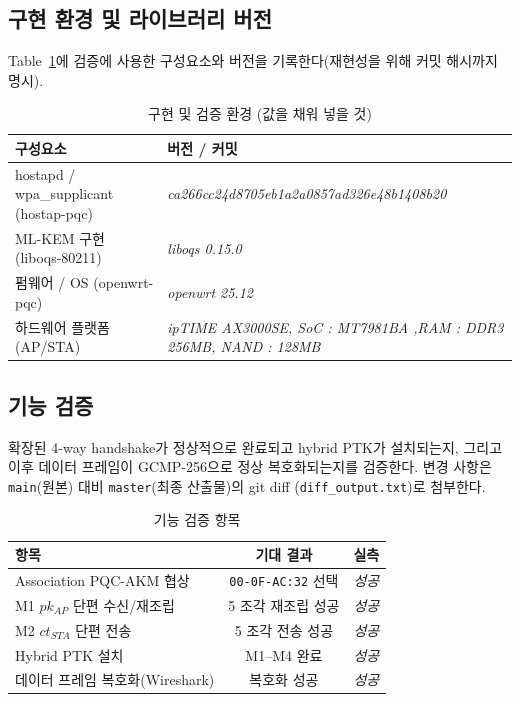 \documentclass[11pt]{article}
\newcommand{\pkAP}{\ensuremath{pk_{AP}}}
\newcommand{\ctSTA}{\ensuremath{ct_{STA}}}
\newcommand{\code}[1]{\texttt{#1}}
\theoremstyle{definition}
\theoremstyle{plain}
\begin{document}
\subsection{구현 환경 및 라이브러리 버전}
Table~\ref{tab:env}에 검증에 사용한 구성요소와 버전을 기록한다(재현성을 위해
커밋 해시까지 명시).

\begin{table}[H]\centering
\caption{구현 및 검증 환경 (값을 채워 넣을 것)}\label{tab:env}
\small
\begin{tabularx}{\linewidth}{@{}lX@{}}
\toprule
구성요소 & 버전 / 커밋 \\ \midrule
hostapd / wpa\_supplicant (hostap-pqc) & \textit{ca266cc24d8705eb1a2a0857ad326e48b1408b20} \\
ML-KEM 구현 (liboqs-80211) & \textit{liboqs 0.15.0} \\
펌웨어 / OS (openwrt-pqc) & \textit{openwrt 25.12} \\
하드웨어 플랫폼 (AP/STA) & \textit{ipTIME AX3000SE, SoC : MT7981BA ,RAM : DDR3 256MB, NAND : 128MB} \\
\bottomrule
\end{tabularx}
\end{table}

\subsection{기능 검증}
확장된 4-way handshake가 정상적으로 완료되고 hybrid PTK가 설치되는지,
그리고 이후 데이터 프레임이 GCMP-256으로 정상 복호화되는지를 검증한다. 변경
사항은 \code{main}(원본) 대비 \code{master}(최종 산출물)의 git diff
(\code{diff\_output.txt})로 첨부한다.

\begin{table}[H]\centering
\caption{기능 검증 항목}\label{tab:func}
\small
\begin{tabularx}{\linewidth}{@{}Xcc@{}}
\toprule
항목 & 기대 결과 & 실측 \\ \midrule
Association PQC-AKM 협상 & \code{00-0F-AC:32} 선택 & \textit{성공} \\
M1 \pkAP{} 단편 수신/재조립 & 5 조각 재조립 성공 & \textit{성공} \\
M2 \ctSTA{} 단편 전송 & 5 조각 전송 성공 & \textit{성공} \\
Hybrid PTK 설치 & M1--M4 완료 & \textit{성공} \\
데이터 프레임 복호화(Wireshark) & 복호화 성공 & \textit{성공} \\
\bottomrule
\end{tabularx}
\end{table}
\end{document}
